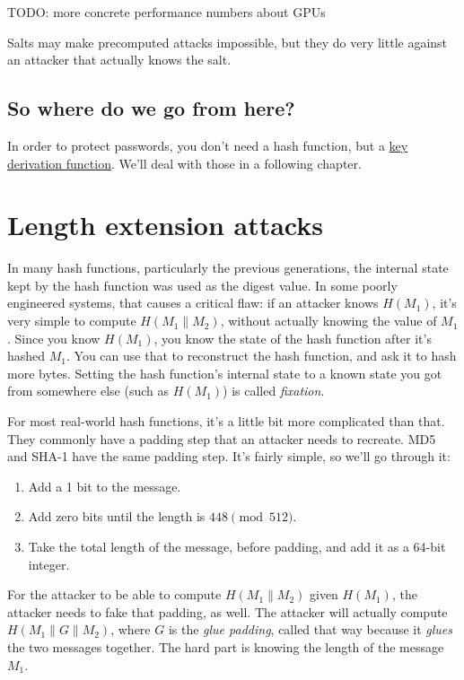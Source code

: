 \documentclass[11pt,ebook,table,dvipsnames]{memoir}
\begin{document}
TODO: more concrete performance numbers about GPUs

Salts may make precomputed attacks impossible, but they do very little
against an attacker that actually knows the salt.
\subsection{So where do we go from here?}
\label{sec-2-6-7-5}

In order to protect passwords, you don't need a hash function, but a
\hyperref[key-derivation-function]{key derivation function}. We'll deal with those in a following chapter.
\section{Length extension attacks}
\label{sec-2-6-8}

In many hash functions, particularly the previous generations, the
internal state kept by the hash function was used as the digest value.
In some poorly engineered systems, that causes a critical flaw: if an
attacker knows $H(M_1)$, it's very simple to compute $H(M_1 \| M_2)$,
without actually knowing the value of $M_1$. Since you know $H(M_1)$,
you know the state of the hash function after it's hashed $M_1$. You
can use that to reconstruct the hash function, and ask it to hash more
bytes. Setting the hash function's internal state to a known state
you got from somewhere else (such as $H(M_1)$) is called \emph{fixation}.

For most real-world hash functions, it's a little bit more complicated
than that. They commonly have a padding step that an attacker needs to
recreate. MD5 and SHA-1 have the same padding step. It's fairly
simple, so we'll go through it:

\begin{enumerate}
\item Add a 1 bit to the message.
\item Add zero bits until the length is $448 \pmod {512}$.
\item Take the total length of the message, before padding, and add it
as a 64-bit integer.
\end{enumerate}

For the attacker to be able to compute $H(M_1 \| M_2)$ given
$H(M_1)$, the attacker needs to fake that padding, as well. The
attacker will actually compute $H(M_1 \| G \| M_2)$, where $G$ is the
\emph{glue padding}, called that way because it \emph{glues} the two messages
together. The hard part is knowing the length of the message $M_1$.
\end{document}
